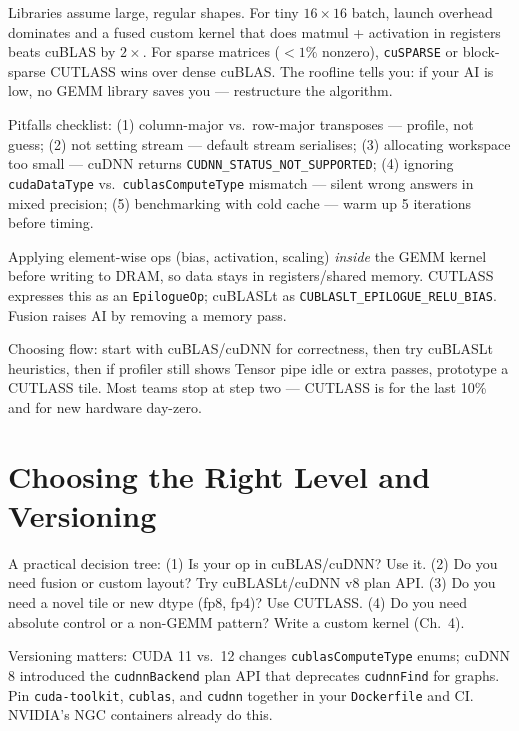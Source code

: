 \begin{example}
Libraries assume large, regular shapes. For tiny $16\times16$ batch, launch overhead dominates and a fused custom kernel that does matmul + activation in registers beats cuBLAS by $2\times$. For sparse matrices ($<1\%$ nonzero), \texttt{cuSPARSE} or block-sparse CUTLASS wins over dense cuBLAS. The roofline tells you: if your AI is low, no GEMM library saves you --- restructure the algorithm.
\end{example}

Pitfalls checklist: (1) column-major vs.\ row-major transposes --- profile, not guess; (2) not setting stream --- default stream serialises; (3) allocating workspace too small --- cuDNN returns \texttt{CUDNN\_STATUS\_NOT\_SUPPORTED}; (4) ignoring \texttt{cudaDataType} vs.\ \texttt{cublasComputeType} mismatch --- silent wrong answers in mixed precision; (5) benchmarking with cold cache --- warm up 5 iterations before timing.

\begin{definition}
Applying element-wise ops (bias, activation, scaling) \emph{inside} the GEMM kernel before writing to DRAM, so data stays in registers/shared memory. CUTLASS expresses this as an \texttt{EpilogueOp}; cuBLASLt as \texttt{CUBLASLT\_EPILOGUE\_RELU\_BIAS}. Fusion raises AI by removing a memory pass.
\end{definition}

Choosing flow: start with cuBLAS/cuDNN for correctness, then try cuBLASLt heuristics, then if profiler still shows Tensor pipe idle or extra passes, prototype a CUTLASS tile. Most teams stop at step two --- CUTLASS is for the last 10\% and for new hardware day-zero.


\section{Choosing the Right Level and Versioning}
A practical decision tree: (1) Is your op in cuBLAS/cuDNN? Use it. (2) Do you need fusion or custom layout? Try cuBLASLt/cuDNN v8 plan API. (3) Do you need a novel tile or new dtype (fp8, fp4)? Use CUTLASS. (4) Do you need absolute control or a non-GEMM pattern? Write a custom kernel (Ch.~4).

Versioning matters: CUDA 11 vs.\ 12 changes \texttt{cublasComputeType} enums; cuDNN 8 introduced the \texttt{cudnnBackend} plan API that deprecates \texttt{cudnnFind} for graphs. Pin \texttt{cuda-toolkit}, \texttt{cublas}, and \texttt{cudnn} together in your \texttt{Dockerfile} and CI. NVIDIA's NGC containers already do this.

